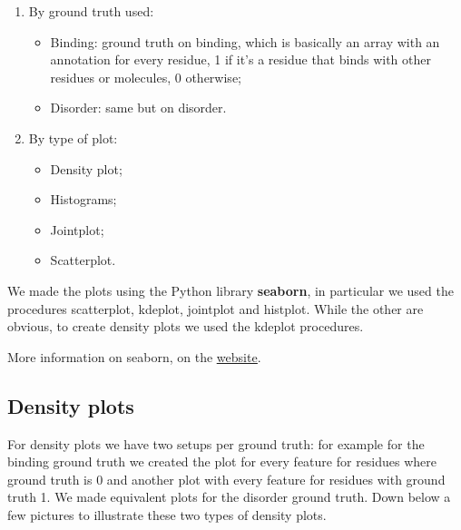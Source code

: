 \begin{enumerate}
    \item By ground truth used:
        \begin{itemize}
            \item Binding: ground truth on binding, which is basically an array with an annotation for every residue, 1 if it's a residue that binds with other residues or molecules, 0 otherwise;
            \item Disorder: same but on disorder.
        \end{itemize}
    \item By type of plot:
        \begin{itemize}
            \item Density plot;
            \item Histograms;
            \item Jointplot;
            \item Scatterplot.
        \end{itemize}
\end{enumerate}

We made the plots using the Python library \textbf{seaborn}, in particular we used the procedures scatterplot, kdeplot, jointplot and histplot. While the other are obvious, to create density plots we used the kdeplot procedures.

More information on seaborn, on the \href{https://seaborn.pydata.org/}\underline{{website}}.

\vspace{10em}

\subsection{Density plots}
For density plots we have two setups per ground truth: for example for the binding ground truth we created the plot for every feature for residues where ground truth is 0 and another plot with every feature for residues with ground truth 1. We made equivalent plots for the disorder ground truth. Down below a few pictures to illustrate these two types of density plots.

\pagebreak

